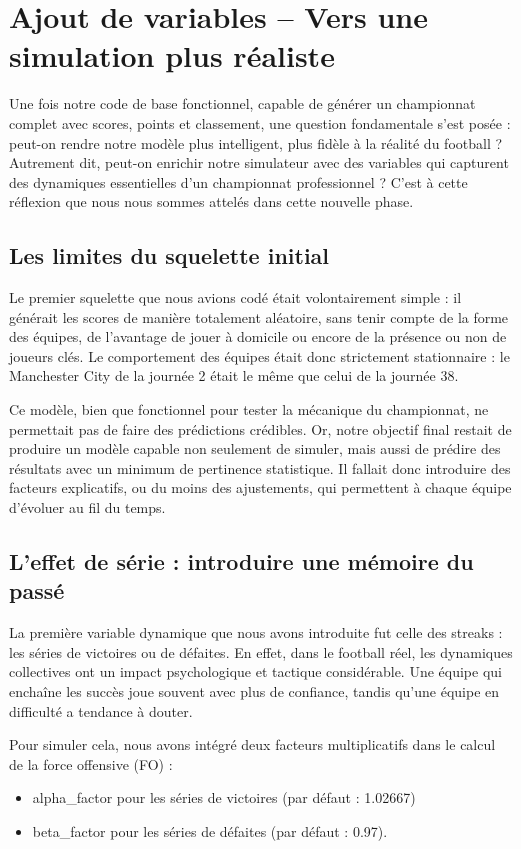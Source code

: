 \documentclass[12pt]{report}
\begin{document}
\chapter{Ajout de variables – Vers une simulation plus réaliste}

Une fois notre code de base fonctionnel, capable de générer un championnat complet avec scores, points et classement, une question fondamentale s’est posée : peut-on rendre notre modèle plus intelligent, plus fidèle à la réalité du football ? Autrement dit, peut-on enrichir notre simulateur avec des variables qui capturent des dynamiques essentielles d’un championnat professionnel ? C’est à cette réflexion que nous nous sommes attelés dans cette nouvelle phase.

\section{Les limites du squelette initial}

Le premier squelette que nous avions codé était volontairement simple : il générait les scores de manière totalement aléatoire, sans tenir compte de la forme des équipes, de l’avantage de jouer à domicile ou encore de la présence ou non de joueurs clés. Le comportement des équipes était donc strictement stationnaire : le Manchester City de la journée 2 était le même que celui de la journée 38.

Ce modèle, bien que fonctionnel pour tester la mécanique du championnat, ne permettait pas de faire des prédictions crédibles. Or, notre objectif final restait de produire un modèle capable non seulement de simuler, mais aussi de prédire des résultats avec un minimum de pertinence statistique. Il fallait donc introduire des facteurs explicatifs, ou du moins des ajustements, qui permettent à chaque équipe d’évoluer au fil du temps.

\section{L’effet de série : introduire une mémoire du passé}

La première variable dynamique que nous avons introduite fut celle des streaks : les séries de victoires ou de défaites. En effet, dans le football réel, les dynamiques collectives ont un impact psychologique et tactique considérable. Une équipe qui enchaîne les succès joue souvent avec plus de confiance, tandis qu’une équipe en difficulté a tendance à douter.

Pour simuler cela, nous avons intégré deux facteurs multiplicatifs dans le calcul de la force offensive (FO) :
\begin{itemize}
  \item alpha\_factor pour les séries de victoires (par défaut : 1.02667)
  \item beta\_factor pour les séries de défaites (par défaut : 0.97).
\end{itemize}
\end{document}
